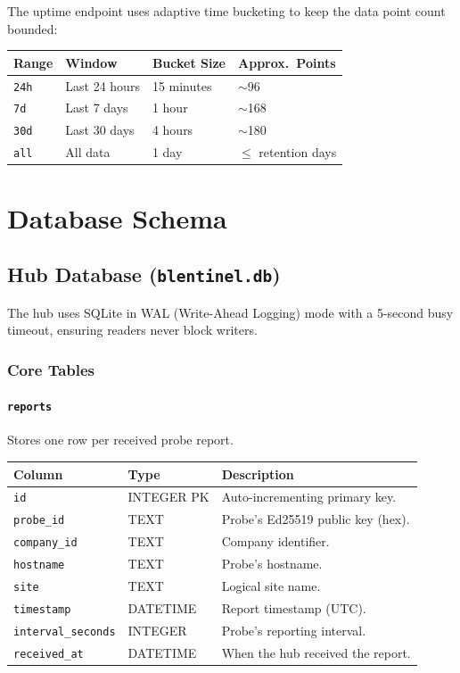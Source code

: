 \documentclass[12pt]{report}
\begin{document}
The uptime endpoint uses adaptive time bucketing to keep the data point count
bounded:

\begin{longtable}{@{} l l l l @{}}
\toprule
\textbf{Range} & \textbf{Window} & \textbf{Bucket Size} &
    \textbf{Approx.\ Points} \\
\midrule
\texttt{24h} & Last 24 hours & 15 minutes & $\sim$96 \\
\texttt{7d}  & Last 7 days   & 1 hour     & $\sim$168 \\
\texttt{30d} & Last 30 days  & 4 hours    & $\sim$180 \\
\texttt{all} & All data      & 1 day      & $\leq$ retention days \\
\bottomrule
\end{longtable}

\section{Database Schema}

\subsection{Hub Database (\texttt{blentinel.db})}

The hub uses SQLite in WAL (Write-Ahead Logging) mode with a 5-second busy
timeout, ensuring readers never block writers.

\subsubsection{Core Tables}

\paragraph{\texttt{reports}} Stores one row per received probe report.

\begin{longtable}{@{} l l p{6cm} @{}}
\toprule
\textbf{Column} & \textbf{Type} & \textbf{Description} \\
\midrule
\texttt{id} & INTEGER PK & Auto-incrementing primary key. \\
\texttt{probe\_id} & TEXT & Probe's Ed25519 public key (hex). \\
\texttt{company\_id} & TEXT & Company identifier. \\
\texttt{hostname} & TEXT & Probe's hostname. \\
\texttt{site} & TEXT & Logical site name. \\
\texttt{timestamp} & DATETIME & Report timestamp (UTC). \\
\texttt{interval\_seconds} & INTEGER & Probe's reporting interval. \\
\texttt{received\_at} & DATETIME & When the hub received the report. \\
\bottomrule
\end{longtable}
\end{document}
